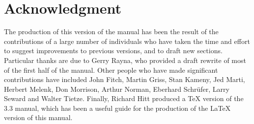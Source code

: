 \chapter*{Acknowledgment}

The production of this version of the manual has been the result of the
contributions of a large number of individuals who have taken the time and
effort to suggest improvements to previous versions, and to draft new
sections.  Particular thanks are due to Gerry Rayna, who provided a draft
rewrite of most of the first half of the manual.  Other people who have
made significant contributions have included John Fitch, Martin Griss,
Stan Kameny, Jed Marti, Herbert Melenk, Don Morrison, Arthur Norman,
Eberhard Schr\"ufer, Larry Seward and Walter Tietze.  Finally, Richard
Hitt produced a {\TeX} version of the {\REDUCE} 3.3 manual, which has been
a useful guide for the production of the {\LaTeX} version of this manual.

